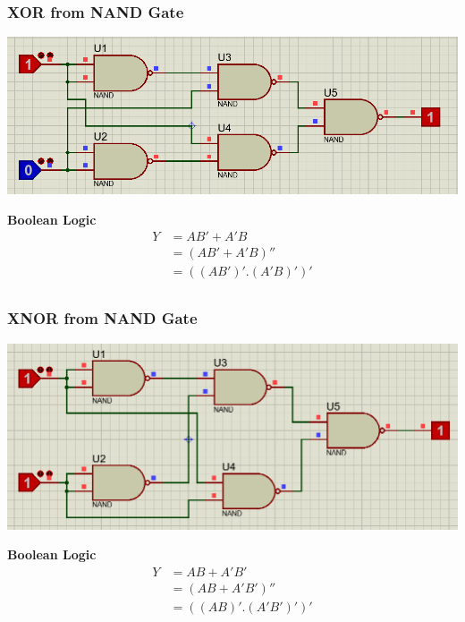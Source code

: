 \documentclass[a4paper, 12pt]{article}
\begin{document}
\subsubsection{XOR from NAND Gate}
\begin{center}
  \includegraphics[scale=0.5]{nand-xor}
\end{center}
\textbf{Boolean Logic}
\begin{equation} 
\begin{split}
  Y & = AB' + A'B \\
    & = (AB' + A'B)'' \\
    & = ((AB')' . (A'B)')' \\
\end{split}
\end{equation}

\subsubsection{XNOR from NAND Gate}
\begin{center}
  \includegraphics[scale=0.5]{nand-xnor}
\end{center}
\textbf{Boolean Logic}
\begin{equation} 
\begin{split}
  Y & = AB + A'B' \\
    & = (AB + A'B')'' \\
    & = ((AB)' . (A'B')')' \\
\end{split}
\end{equation}
\end{document}
